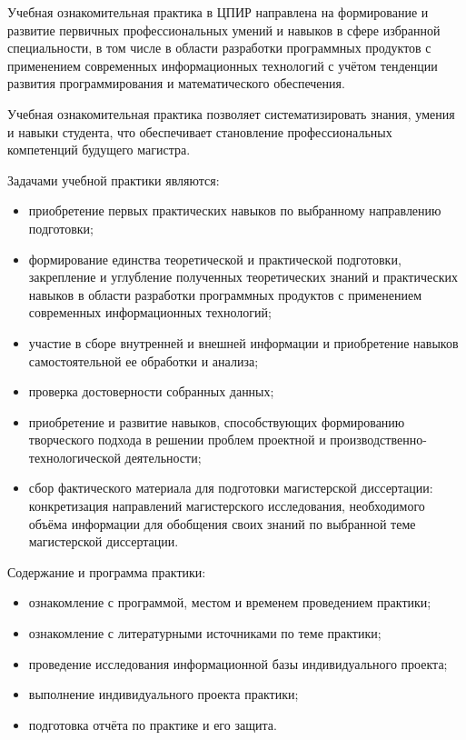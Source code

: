 \documentclass[../document.tex]{subfiles}
\begin{document}
    \par Учебная ознакомительная практика в ЦПИР направлена на формирование и развитие первичных профессиональных умений и навыков в сфере избранной специальности, в том числе в области разработки программных продуктов с применением современных информационных технологий с учётом тенденции развития программирования и математического обеспечения. 
    \par Учебная ознакомительная практика позволяет систематизировать знания, умения и навыки студента, что обеспечивает становление профессиональных компетенций будущего магистра.
    \par Задачами учебной практики являются:
    \begin{itemize}
        \item приобретение первых практических навыков по выбранному направлению подготовки;
        \item формирование единства теоретической и практической подготовки, закрепление и углубление полученных теоретических знаний и практических навыков в области разработки программных продуктов с применением современных информационных технологий;
        \item участие в сборе внутренней и внешней информации и приобретение навыков самостоятельной ее обработки и анализа;
        \item проверка достоверности собранных данных;
        \item приобретение и развитие навыков, способствующих формированию творческого подхода в решении проблем проектной и производственно-технологической деятельности;
        \item сбор фактического материала для подготовки магистерской диссертации: конкретизация направлений магистерского исследования, необходимого объёма информации для обобщения своих знаний по выбранной теме магистерской диссертации.
    \end{itemize}
    Содержание и программа практики:
    \begin{itemize}
        \item ознакомление с программой, местом и временем проведением практики;
        \item ознакомление с литературными источниками по теме практики;
        \item проведение исследования информационной базы индивидуального проекта;
        \item выполнение индивидуального проекта практики;
        \item подготовка отчёта по практике и его защита.
    \end{itemize}
\end{document}
